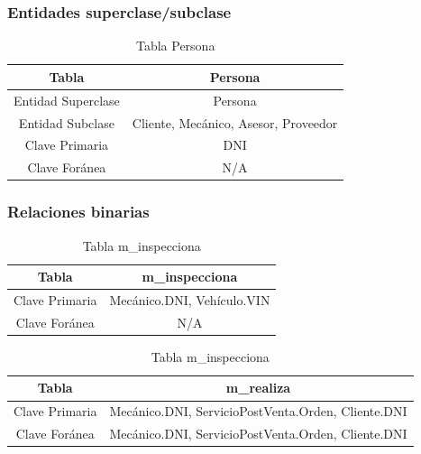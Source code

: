 \documentclass[12pt]{article}
\begin{document}
\subsubsection{Entidades superclase/subclase}

\begin{table}[htbp]
\begin{center}
\begin{tabular}{|c|c|}
\hline
Tabla & Persona \\
\hline
Entidad Superclase & Persona \\
\hline
Entidad Subclase & Cliente, Mecánico, Asesor, Proveedor \\
Clave Primaria & DNI \\
\hline
Clave Foránea & N/A \\
\hline
\end{tabular}        
\caption{Tabla Persona}
\label{tab:tablas}
\end{center}
\end{table}


\subsubsection{Relaciones binarias}

\begin{table}[htbp]
\begin{center}
\begin{tabular}{|c|c|}
\hline
Tabla & m\_inspecciona \\
\hline
Clave Primaria & Mecánico.DNI, Vehículo.VIN \\
\hline
Clave Foránea & N/A \\
\hline
\end{tabular}
\caption{Tabla m\_inspecciona}
\label{tab:tablas}
\end{center}
\end{table}

\begin{table}[htbp]
\begin{center}
\begin{tabular}{|c|c|}
\hline
Tabla & m\_realiza \\
\hline
Clave Primaria & Mecánico.DNI, ServicioPostVenta.Orden, Cliente.DNI \\
\hline
Clave Foránea & Mecánico.DNI, ServicioPostVenta.Orden, Cliente.DNI \\
\hline
\end{tabular}
\caption{Tabla m\_inspecciona}
\label{tab:tablas}
\end{center}
\end{table}
\end{document}
